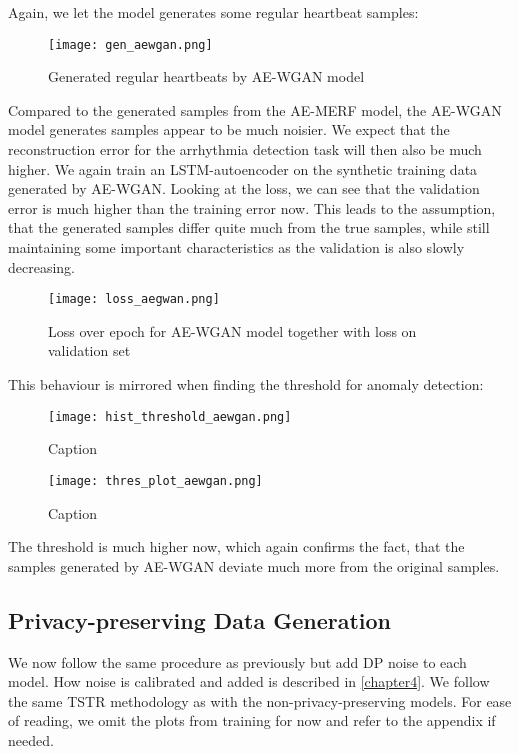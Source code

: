Again, we let the model generates some regular heartbeat samples:
\begin{figure}[H]
    \centering
    \texttt{[image: gen\_aewgan.png]}
    \caption{Generated regular heartbeats by AE-WGAN model}
\end{figure}

Compared to the generated samples from the AE-MERF model, the AE-WGAN model generates samples appear to be much noisier. We expect that the reconstruction error for the arrhythmia detection task will then also be much higher. We again train an LSTM-autoencoder on the synthetic training data generated by AE-WGAN. Looking at the loss, we can see that the validation error is much higher than the training error now. This leads to the assumption, that the generated samples differ quite much from the true samples, while still maintaining some important characteristics as the validation is also slowly decreasing.

\begin{figure}[H]
    \centering
    \texttt{[image: loss\_aegwan.png]}
    \caption{Loss over epoch for AE-WGAN model together with loss on validation set}
\end{figure}

This behaviour is mirrored when finding the threshold for anomaly detection:
\begin{figure}[h]
    \begin{minipage}[b]{0.45\textwidth}
        \centering
        \texttt{[image: hist\_threshold\_aewgan.png]}
        \caption{Caption}
        \label{fig:enter-label}
    \end{minipage}
    \begin{minipage}[b]{0.45\textwidth}
        \centering
        \texttt{[image: thres\_plot\_aewgan.png]}
        \caption{Caption}
        \label{fig:enter-label}
    \end{minipage}
\end{figure}

The threshold is much higher now, which again confirms the fact, that the samples generated by AE-WGAN deviate much more from the original samples.

\subsection{Privacy-preserving Data Generation}
We now follow the same procedure as previously but add DP noise to each model. How noise is calibrated and added is described in \cref{chapter4}. We follow the same TSTR methodology as with the non-privacy-preserving models. For ease of reading, we omit the plots from training for now and refer to the appendix if needed. 


